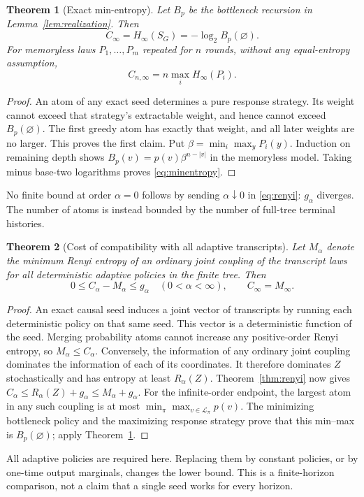 \documentclass[11pt,a4paper]{article}
\newtheorem{theorem}{Theorem}
\begin{document}
\begin{theorem}[Exact min-entropy]\label{thm:minentropy}
Let $B_p$ be the bottleneck recursion in Lemma~\ref{lem:realization}.
Then
\[
C_\infty=H_\infty(S_G)=-\log_2 B_p(\varnothing).
\]
For memoryless laws $P_1,\ldots,P_m$ repeated for $n$ rounds, without
any equal-entropy assumption,
\begin{equation}\label{eq:minentropy}
C_{n,\infty}=n\max_iH_\infty(P_i).
\end{equation}
\end{theorem}
\begin{proof}
An atom of any exact seed determines a pure response strategy. Its
weight cannot exceed that strategy's extractable weight, and hence
cannot exceed $B_p(\varnothing)$. The first greedy atom has exactly
that weight, and all later weights are no larger. This proves the first
claim. Put $\beta=\min_i\max_yP_i(y)$. Induction on remaining depth
shows $B_p(v)=p(v)\beta^{n-|v|}$ in the memoryless model. Taking minus
base-two logarithms proves \eqref{eq:minentropy}.
\end{proof}
No finite bound at order $\alpha=0$ follows by sending $\alpha\downarrow0$
in \eqref{eq:renyi}: $g_\alpha$ diverges. The number of atoms is instead
bounded by the number of full-tree terminal histories.

\begin{theorem}[Cost of compatibility with all adaptive transcripts]\label{thm:compatibility}
Let $M_\alpha$ denote the minimum Renyi entropy of an \emph{ordinary}
joint coupling of the transcript laws for all deterministic adaptive
policies in the finite tree. Then
\[
0\le C_\alpha-M_\alpha\le g_\alpha\quad(0<\alpha<\infty),
\qquad C_\infty=M_\infty.
\]
\end{theorem}
\begin{proof}
An exact causal seed induces a joint vector of transcripts by running
each deterministic policy on that same seed. This vector is a
deterministic function of the seed. Merging probability atoms cannot
increase any positive-order Renyi entropy, so $M_\alpha\le C_\alpha$.
Conversely, the information of any ordinary joint coupling dominates
the information of each of its coordinates. It therefore dominates
$Z$ stochastically and has entropy at least $R_\alpha(Z)$.
Theorem~\ref{thm:renyi} now gives
$C_\alpha\le R_\alpha(Z)+g_\alpha\le M_\alpha+g_\alpha$.
For the infinite-order endpoint, the largest atom in any such coupling
is at most $\min_\pi\max_{v\in\mathcal L_\pi}p(v)$.
The minimizing bottleneck policy and the maximizing response strategy
prove that this min--max is $B_p(\varnothing)$; apply
Theorem~\ref{thm:minentropy}.
\end{proof}
All adaptive policies are required here. Replacing them by constant
policies, or by one-time output marginals, changes the lower bound.
This is a finite-horizon comparison, not a claim that a single seed
works for every horizon.
\end{document}
